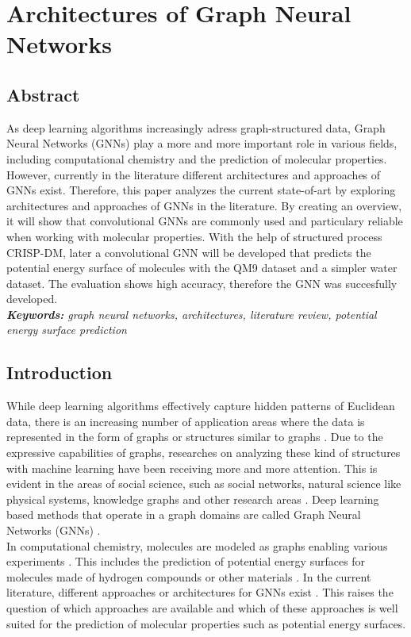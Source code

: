 
\chapter{Architectures of Graph Neural Networks}

\section*{Abstract}

As deep learning algorithms increasingly adress graph-structured data, Graph Neural Networks (GNNs) play a more and more important role in various fields, including computational chemistry and the prediction of molecular properties. However, currently in the literature different architectures and approaches of GNNs exist. Therefore, this paper analyzes the current state-of-art by exploring architectures and approaches of GNNs in the literature. By creating an overview, it will show that convolutional GNNs are commonly used and particulary reliable when working with molecular properties. With the help of structured process CRISP-DM, later a convolutional GNN will be developed that predicts the potential energy surface of molecules with the QM9 dataset and a simpler water dataset. The evaluation shows high accuracy, therefore the GNN was succesfully developed. \\

\textit{\textbf{Keywords:} graph neural networks, architectures, literature review, potential energy surface prediction}

\section{Introduction}
While deep learning algorithms effectively capture hidden patterns of Euclidean data, there is an increasing number of application areas where the data is represented in the form of graphs or structures similar to graphs \cite{wu_comprehensive_2021}. Due to the expressive capabilities of graphs, researches on analyzing these kind of structures with machine learning have been receiving more and more attention. This is evident in the areas of social science, such as social networks, natural science like physical systems, knowledge graphs and other research areas \cite{zhou_graph_2020}. Deep learning based methods that operate in a graph domains are called Graph Neural Networks (GNNs) \cite{velickovic_everything_2023}. \\ 
In computational chemistry, molecules are modeled as graphs enabling various experiments \cite{wu_comprehensive_2021}. This includes the prediction of potential energy surfaces for  molecules made of hydrogen compounds or other materials \cite{liu_computational_2023}. In the current literature, different approaches or architectures for GNNs exist \cite{wu_comprehensive_2021}. This raises the question of which approaches are available and which of these approaches is well suited for the prediction of molecular properties such as potential energy surfaces. \\

